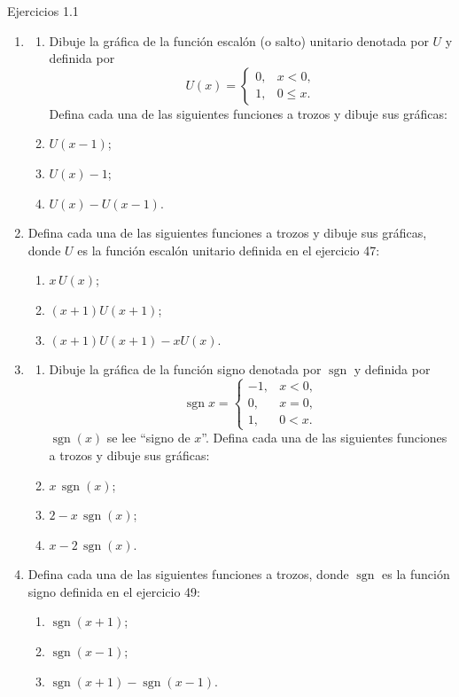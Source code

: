 \documentclass[aspectratio=169,10pt]{beamer}
\begin{document}
\begin{frame}{Ejercicios 1.1}
\begin{enumerate}
\item
\begin{enumerate}
\item Dibuje la gráfica de la función escalón (o salto) unitario denotada por $U$ y definida por
\[
U(x)=\begin{cases}0,&x<0,\\1,&0\le x.\end{cases}
\]
Defina cada una de las siguientes funciones a trozos y dibuje sus gráficas:
\item $U(x-1)$; \item $U(x)-1$; \item $U(x)-U(x-1)$.
\end{enumerate}

\item Defina cada una de las siguientes funciones a trozos y dibuje sus gráficas, donde $U$ es la función escalón unitario definida en el ejercicio 47:
\begin{enumerate}
\item $x\,U(x)$; \item $(x+1)U(x+1)$; \item $(x+1)U(x+1)-xU(x)$.
\end{enumerate}

\item
\begin{enumerate}
\item Dibuje la gráfica de la función signo denotada por $\operatorname{sgn}$ y definida por
\[
\operatorname{sgn}x=\begin{cases}-1,&x<0,\\0,&x=0,\\1,&0<x.\end{cases}
\]
$\operatorname{sgn}(x)$ se lee ``signo de $x$''. Defina cada una de las siguientes funciones a trozos y dibuje sus gráficas:
\item $x\,\operatorname{sgn}(x)$; \item $2-x\,\operatorname{sgn}(x)$; \item $x-2\,\operatorname{sgn}(x)$.
\end{enumerate}

\item Defina cada una de las siguientes funciones a trozos, donde $\operatorname{sgn}$ es la función signo definida en el ejercicio 49:
\begin{enumerate}
\item $\operatorname{sgn}(x+1)$; \item $\operatorname{sgn}(x-1)$; \item $\operatorname{sgn}(x+1)-\operatorname{sgn}(x-1)$.
\end{enumerate}


\end{enumerate}
\end{frame}
\end{document}
